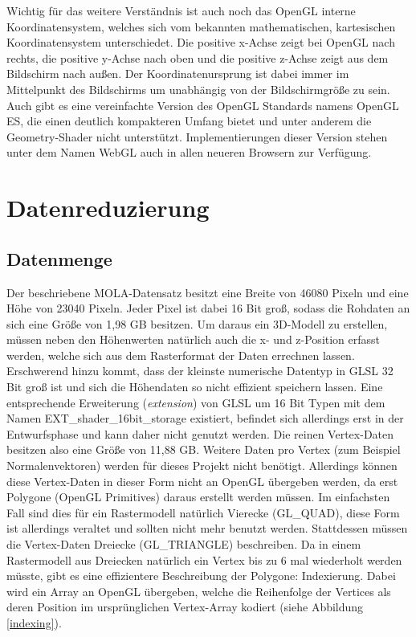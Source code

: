 Wichtig für das weitere Verständnis ist auch noch das OpenGL interne Koordinatensystem, welches sich vom bekannten mathematischen, kartesischen Koordinatensystem unterschiedet. Die positive x-Achse zeigt bei OpenGL nach rechts, die positive y-Achse nach oben und die positive z-Achse zeigt aus dem Bildschirm nach außen. Der Koordinatenursprung ist dabei immer im Mittelpunkt des Bildschirms um unabhängig von der Bildschirmgröße zu sein. Auch gibt es eine vereinfachte Version des OpenGL Standards namens OpenGL ES, die einen deutlich kompakteren Umfang bietet und unter anderem die Geometry-Shader nicht unterstützt. Implementierungen dieser Version stehen unter dem Namen WebGL auch in allen neueren Browsern zur Verfügung.

\section{Datenreduzierung}\label{datenreduzierung}

\subsection{Datenmenge}\label{datenmenge}
Der beschriebene MOLA-Datensatz besitzt eine Breite von 46080 Pixeln und eine Höhe von 23040 Pixeln. Jeder Pixel ist dabei 16 Bit groß, sodass die Rohdaten an sich eine Größe von 1,98 GB besitzen\cite{molaDataExtended}. Um daraus ein 3D-Modell zu erstellen, müssen neben den Höhenwerten natürlich auch die x- und z-Position erfasst werden, welche sich aus dem Rasterformat der Daten errechnen lassen. Erschwerend hinzu kommt, dass der kleinste numerische Datentyp in GLSL 32 Bit groß ist\cite[Abschnitt 4.1]{glslSpec} und sich die Höhendaten so nicht effizient speichern lassen. Eine entsprechende Erweiterung (\textit{extension}) von GLSL um 16 Bit Typen mit dem Namen EXT\_shader\_16bit\_storage existiert, befindet sich allerdings erst in der Entwurfsphase und kann daher nicht genutzt werden. Die reinen Vertex-Daten besitzen also eine Größe von 11,88 GB. Weitere Daten pro Vertex (zum Beispiel Normalenvektoren) werden für dieses Projekt nicht benötigt. Allerdings können diese Vertex-Daten in dieser Form nicht an OpenGL übergeben werden, da erst Polygone (OpenGL Primitives) daraus erstellt werden müssen. Im einfachsten Fall sind dies für ein Rastermodell natürlich Vierecke (GL\_QUAD), diese Form ist allerdings veraltet und sollten nicht mehr benutzt werden. Stattdessen müssen die Vertex-Daten  Dreiecke (GL\_TRIANGLE) beschreiben. Da in einem Rastermodell aus Dreiecken natürlich ein Vertex bis zu 6 mal wiederholt werden müsste, gibt es eine effizientere Beschreibung der Polygone: Indexierung. Dabei wird ein Array an OpenGL übergeben, welche die Reihenfolge der Vertices als deren Position im ursprünglichen Vertex-Array kodiert (siehe Abbildung \ref{indexing}).

